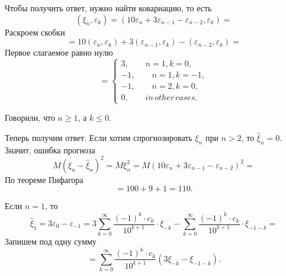\begin{enumerate}[label=\alph*)]
  Чтобы получить ответ, нужно найти ковариацию, то есть
  \begin{equation*}
    \left( \xi_n, \varepsilon_k \right) =
    \left( 10 \varepsilon_n + 3 \varepsilon_{n - 1} - \varepsilon_{n - 2}, \varepsilon_k \right) =
  \end{equation*}
  Раскроем скобки
  \begin{equation*}
    = 10 \left( \varepsilon_n, \varepsilon_k \right) +
    3 \left( \varepsilon_{n - 1}, \varepsilon_k \right) -
    \left( \varepsilon_{n - 2}, \varepsilon_k \right) =
  \end{equation*}
  Первое слагаемое равно нулю
  \begin{equation*}
    = \begin{cases}
      3, \qquad n = 1, k = 0, \\
      -1, \qquad n = 1, k = -1, \\
      -1, \qquad n = 2, k = 0, \\
      0, \qquad in \, other \, cases.
    \end{cases}
  \end{equation*}

  Говорили, что $n \geq 1$, а $k \leq 0$.

  Теперь получим ответ.
  Если хотим спрогнозировать $ \xi_n$ при $n > 2$, то $ \hat{ \xi }_n = 0$.
  Значит, ошибка прогноза
  \begin{equation*}
    M \left( \xi_n - \hat{ \xi }_n \right)^2 =
    M \xi_n^2 =
    M \left( 10 \varepsilon_n + 3 \varepsilon_{n - 1} - \varepsilon_{n - 2} \right)^2 =
  \end{equation*}
  По теореме Пифагора
  \begin{equation*}
    = 100 + 9 + 1 =
    110.
  \end{equation*}

  Если $n = 1$, то
  \begin{equation*}
    \hat{ \xi }_1 =
    3 \varepsilon_0 - \varepsilon_{-1} =
    3 \sum \limits_{k = 0}^{ \infty }
      \frac{ \left( -1 \right)^k \cdot c_k}{10^{k + 1}} \cdot \xi_{-k} -
    \sum \limits_{k = 0}^{ \infty }
      \frac{ \left( -1 \right)^k \cdot c_k}{10^{k + 1}} \cdot \xi_{-1 - k} =
  \end{equation*}
  Запишем под одну сумму
  \begin{equation*}
    = \sum \limits_{k = 0}^{ \infty } \frac{ \left( -1 \right)^k \cdot c_k}{10^{k + 1}}
    \left( 3 \xi_{-k} - \xi_{-1 - k} \right).
  \end{equation*}


\end{enumerate}
